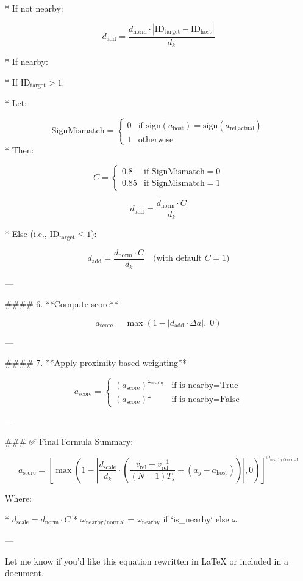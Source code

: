 \documentclass{article}
\begin{document}
* If not nearby:

$$
d_{\text{add}} = \frac{d_{\text{norm}} \cdot |\text{ID}_{\text{target}} - \text{ID}_{\text{host}}|}{d_k}
$$

* If nearby:

  * If $\text{ID}_{\text{target}} > 1$:

    * Let:

      $$
      \text{SignMismatch} = \begin{cases}
      0 & \text{if } \text{sign}(a_{\text{host}}) = \text{sign}(a_{\text{rel,actual}}) \\
      1 & \text{otherwise}
      \end{cases}
      $$
    * Then:

      $$
      C = \begin{cases}
      0.8 & \text{if SignMismatch} = 0 \\
      0.85 & \text{if SignMismatch} = 1
      \end{cases}
      $$

    $$
    d_{\text{add}} = \frac{d_{\text{norm}} \cdot C}{d_k}
    $$

  * Else (i.e., $\text{ID}_{\text{target}} \leq 1$):

    $$
    d_{\text{add}} = \frac{d_{\text{norm}} \cdot C}{d_k} \quad \text{(with default } C = 1 \text{)}
    $$

---

#### 6. **Compute score**

$$
a_{\text{score}} = \max \left(1 - \left| d_{\text{add}} \cdot \Delta a \right|, \; 0 \right)
$$

---

#### 7. **Apply proximity-based weighting**

$$
a_{\text{score}} =
\begin{cases}
\left(a_{\text{score}}\right)^{\omega_{\text{nearby}}} & \text{if is\_nearby} = \text{True} \\
\left(a_{\text{score}}\right)^{\omega} & \text{if is\_nearby} = \text{False}
\end{cases}
$$

---

### ✅ Final Formula Summary:

$$
a_{\text{score}} = \left[ \max \left(1 - \left| \frac{d_{\text{scale}}}{d_k} \cdot \left( \frac{v_{\text{rel}} - v_{\text{rel}}^{-1}}{(N - 1) T_s} - (a_y - a_{\text{host}}) \right) \right|, 0 \right) \right]^{\omega_{\text{nearby/normal}}}
$$

Where:

* $d_{\text{scale}} = d_{\text{norm}} \cdot C$
* $\omega_{\text{nearby/normal}} = \omega_{\text{nearby}}$ if `is_nearby` else $\omega$

---

Let me know if you'd like this equation rewritten in LaTeX or included in a document.
\end{document}
